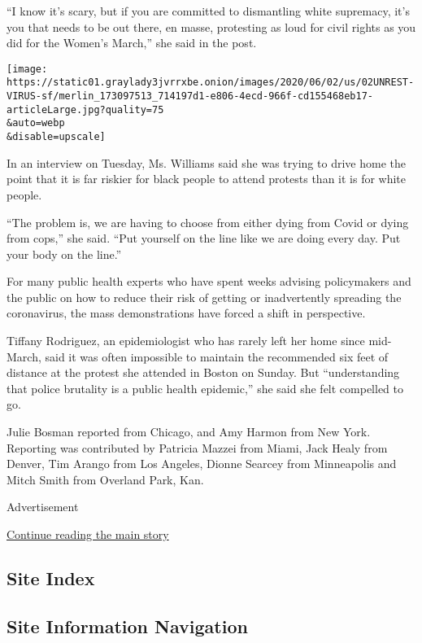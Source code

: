 ``I know it's scary, but if you are committed to dismantling white
supremacy, it's you that needs to be out there, en masse, protesting as
loud for civil rights as you did for the Women's March,'' she said in
the post.

\texttt{[image: https://static01.graylady3jvrrxbe.onion/images/2020/06/02/us/02UNREST-VIRUS-sf/merlin\_173097513\_714197d1-e806-4ecd-966f-cd155468eb17-articleLarge.jpg?quality=75\\\&auto=webp\\\&disable=upscale]}

In an interview on Tuesday, Ms. Williams said she was trying to drive
home the point that it is far riskier for black people to attend
protests than it is for white people.

``The problem is, we are having to choose from either dying from Covid
or dying from cops,'' she said. ``Put yourself on the line like we are
doing every day. Put your body on the line.''

For many public health experts who have spent weeks advising
policymakers and the public on how to reduce their risk of getting or
inadvertently spreading the coronavirus, the mass demonstrations have
forced a shift in perspective.

Tiffany Rodriguez, an epidemiologist who has rarely left her home since
mid-March, said it was often impossible to maintain the recommended six
feet of distance at the protest she attended in Boston on Sunday. But
``understanding that police brutality is a public health epidemic,'' she
said she felt compelled to go.

Julie Bosman reported from Chicago, and Amy Harmon from New York.
Reporting was contributed by Patricia Mazzei from Miami, Jack Healy from
Denver, Tim Arango from Los Angeles, Dionne Searcey from Minneapolis and
Mitch Smith from Overland Park, Kan.

Advertisement

\protect\hyperlink{after-bottom}{Continue reading the main story}

\hypertarget{site-index}{%
\subsection{Site Index}\label{site-index}}

\hypertarget{site-information-navigation}{%
\subsection{Site Information
Navigation}\label{site-information-navigation}}

